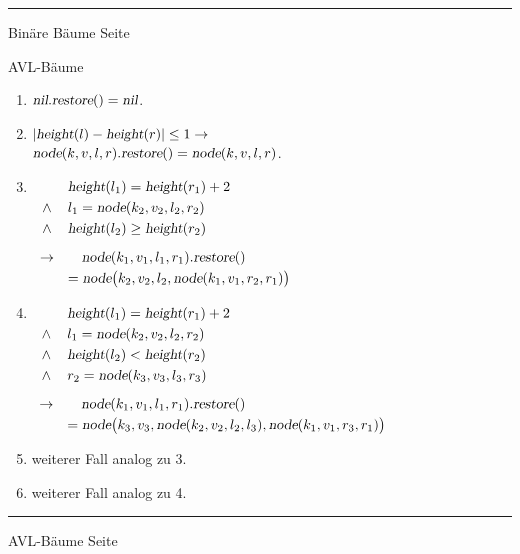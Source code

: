 \documentclass{slides}
\newcounter{mypage}
\begin{document}
\begin{slide}{}
\vspace*{\fill}
\tiny \addtocounter{mypage}{1}
\rule{17cm}{1mm}
Bin\"are B\"aume \hspace*{\fill} Seite 
\end{slide}


\begin{slide}{}
\normalsize

\begin{center}
AVL-B\"aume
\end{center}

\footnotesize
\begin{enumerate}
\item $\textsl{nil}.\textsl{restore}() = \textsl{nil}$.
\item $|\textsl{height}(l) - \textsl{height}(r)| \leq 1 \rightarrow$ \\[0.3cm]
       \hspace*{1.3cm}  
      $\textsl{node}(k,v,l,r).\textsl{restore}() = \textsl{node}(k,v,l,r)$.
\item $\begin{array}[t]{cl}
              & \textsl{height}(l_1) = \textsl{height}(r_1) + 2    \\[0.1cm] 
       \wedge & l_1 = \textsl{node}(k_2,v_2,l_2,r_2)               \\[0.1cm]
       \wedge & \textsl{height}(l_2) \geq \textsl{height}(r_2)     \\[0.3cm]
       \rightarrow & \quad \textsl{node}(k_1,v_1,l_1,r_1).\textsl{restore}() \\[0.1cm]
                   & = \textsl{node}\bigl(k_2,v_2,l_2,\textsl{node}(k_1,v_1,r_2,r_1)\bigr)
       \end{array}
      $
\item $\begin{array}[t]{cl}
               & \textsl{height}(l_1) = \textsl{height}(r_1) + 2    \\[0.1cm] 
        \wedge & l_1 = \textsl{node}(k_2,v_2,l_2,r_2)               \\[0.1cm]
        \wedge & \textsl{height}(l_2) < \textsl{height}(r_2)        \\[0.1cm]
        \wedge & r_2 = \textsl{node}(k_3,v_3,l_3,r_3)               \\[0.3cm]
        \rightarrow & \quad \textsl{node}(k_1,v_1,l_1,r_1).\textsl{restore}() \\[0.1cm]
                    & =     \textsl{node}\bigl(k_3,v_3,\textsl{node}(k_2,v_2,l_2,l_3),\textsl{node}(k_1,v_1,r_3,r_1) \bigr)
        \end{array}
       $
\item weiterer Fall analog zu 3.
\item weiterer Fall analog zu 4.
\end{enumerate}


\vspace*{\fill}
\tiny \addtocounter{mypage}{1}
\rule{17cm}{1mm}
AVL-B\"aume \hspace*{\fill} Seite 
\end{slide}
\end{document}
